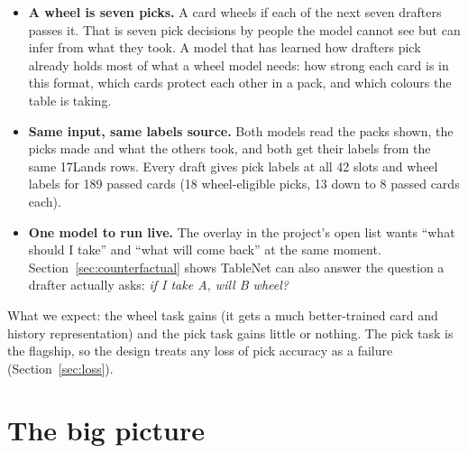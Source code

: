 \documentclass[11pt,letterpaper]{article}
\begin{document}
\begin{itemize}
\item \textbf{A wheel is seven picks.} A card wheels if each of the next seven drafters passes it. That is
seven pick decisions by people the model cannot see but can infer from what they took. A model that has
learned how drafters pick already holds most of what a wheel model needs: how strong each card is in this
format, which cards protect each other in a pack, and which colours the table is taking.
\item \textbf{Same input, same labels source.} Both models read the packs shown, the picks made and what
the others took, and both get their labels from the same 17Lands rows. Every draft gives pick labels at all
42 slots and wheel labels for 189 passed cards (18 wheel-eligible picks, 13 down to 8 passed cards
each).
\item \textbf{One model to run live.} The overlay in the project's open list wants ``what should I take''
and ``what will come back'' at the same moment. Section~\ref{sec:counterfactual} shows TableNet
can also answer the question a drafter actually asks: \emph{if I take A, will B wheel?}
\end{itemize}

What we expect: the wheel task gains (it gets a much better-trained card and history representation) and
the pick task gains little or nothing. The pick task is the flagship, so the design treats any loss of pick
accuracy as a failure (Section~\ref{sec:loss}).

\section{The big picture}
\end{document}

